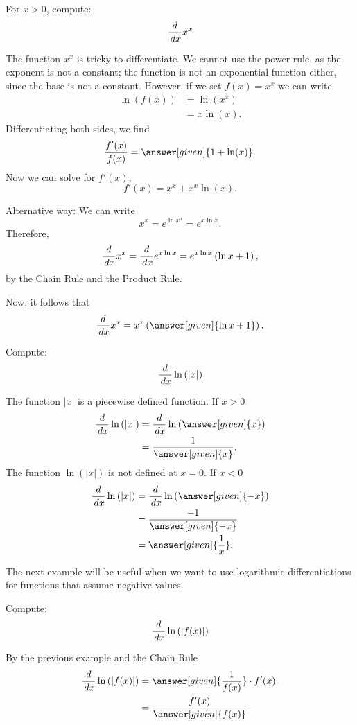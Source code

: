 \documentclass{ximera}
\begin{document}
\begin{example}
	For  $x>0$, compute: 
	\[ \frac{d}{\,d x} x^x \]
	\begin{explanation}
		The function $x^x$ is tricky to differentiate. We cannot use the power
		rule, as the exponent is not a constant; the function is not an exponential function either, since the base is not a constant. However, if we set $f(x) =
		x^x$ we can write
		\begin{align*}
			\ln(f(x)) &= \ln\left(x^x\right)\\
				&=x\ln(x).
		\end{align*}
		Differentiating both sides, we find
		\[ \frac{f'(x)}{f(x)} = \answer[given]{1 + \ln(x)}. \]
		Now we can solve for $f'(x)$, 
		\[ f'(x) = x^x + x^x\ln(x). \]
		
		Alternative way: We can write 
		\[ x^x= e^{\ln{x^x}}=e^{x\ln{x}}. \]
		Therefore,
		\[ \frac{d}{\,d x} x^x=\frac{d}{\,d x} e^{x\ln{x}}=e^{x\ln{x}}\left(\ln{x}+1\right), \]
		by the Chain Rule and the Product Rule.
		
		Now, it follows  that
		\[ \ddx x^x=x^x\left(\answer[given]{\ln{x}+1}\right). \]
	\end{explanation}
\end{example}


\begin{example}
	Compute:
	\[ \frac{d}{\,d x}\ln{(|x|)} \]
	\begin{explanation}
		The function $|x|$ is a piecewise defined function.  If $x>0$
		\begin{align*}
			\ddx\ln{(|x|)} &= \ddx\ln{(\answer[given]{x})}\\
				&=\frac{1}{\answer[given]{x}}.
		\end{align*}
		The function $\ln{(|x|)}$ is not defined at $x=0$.  If $x<0$
		\begin{align*}
			\ddx\ln{(|x|)} &= \ddx\ln{(\answer[given]{-x})}\\
				&=\frac{-1}{\answer[given]{-x}}\\
				&=\answer[given]{\frac{1}{x}}.
		\end{align*}
	\end{explanation}
\end{example}

The next  example will be useful when we want to use logarithmic differentiations for functions that  assume negative values. 


\begin{example}
	Compute:
	\[ \frac{d}{\,d x}\ln{(|f(x)|)} \]
	\begin{explanation}
		By the previous example and the Chain Rule
		\begin{align*}
			\ddx\ln{(|f(x)|)} &=\answer[given]{\frac{1}{f(x)}}\cdot f'(x).\\
				&=\frac{f'(x)}{\answer[given]{f(x)}}
		\end{align*}
	\end{explanation}
\end{example}
\end{document}
